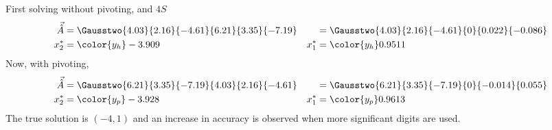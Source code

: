 \begin{enumerate}
\begin{enumerate}
                    First solving without pivoting, and $ 4S $
                    \begin{align}
                        \vec{\hat{A}}       & = \Gausstwo{4.03}{2.16}{-4.61}
                        {6.21}{3.35}{-7.19} &
                                            & = \Gausstwo{4.03}{2.16}{-4.61}
                        {0}{0.022}{-0.086}                                     \\
                        x_2^*               & = \color{y_h} -3.909           &
                        x_1^*               & = \color{y_h} 0.9511
                    \end{align}
                    Now, with pivoting,
                    \begin{align}
                        \vec{\hat{A}}       & = \Gausstwo{6.21}{3.35}{-7.19}
                        {4.03}{2.16}{-4.61} &
                                            & = \Gausstwo{6.21}{3.35}{-7.19}
                        {0}{-0.014}{0.055}                                     \\
                        x_2^*               & = \color{y_p} -3.928           &
                        x_1^*               & = \color{y_p} 0.9613
                    \end{align}
                    The true solution is $ (-4, 1) $ and an increase in accuracy is
                    observed when more significant digits are used.
          \end{enumerate}
\end{enumerate}